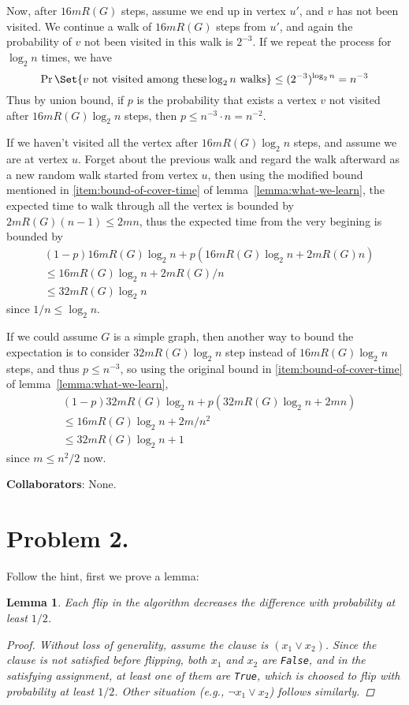 \documentclass[12pt, a4paper]{article}
\newtheorem{lemma}{Lemma}
\begin{document}
Now, after $16 m R(G)$ steps, assume we end up in vertex $u'$, and $v$ has not been visited.
We continue a walk of $16 m R(G)$ steps from $u'$, and again the probability
of $v$ not been visited in this walk is $2^{-3}$. If we repeat the process
for $\log_2 n$ times, we have
\[ \Pr\Set{ v \text{ not visited among these} \log_2 n \text{ walks} } \leq (2^{-3})^{\log_2 n} = n^{-3} \]
Thus by union bound, if $p$ is the probability that exists a vertex $v$ not visited after
$16 m R(G) \log_2 n$ steps, then $p \leq n^{-3} \cdot n = n^{-2}$.

If we haven't visited all the vertex after $16 m R(G) \log_2 n$ steps,
and assume we are at vertex $u$. Forget about the previous walk and regard
the walk afterward as a new random walk started from vertex $u$,
then using the modified bound mentioned in
\ref{item:bound-of-cover-time} of lemma~\ref{lemma:what-we-learn},
the expected time to walk through all the vertex is bounded by $2 m R(G) (n-1) \leq 2mn$,
thus the expected time from the very begining is bounded by
\begin{align*}
  & (1-p) 16 m R(G) \log_2 n + p ( 16 m R(G) \log_2 n + 2m R(G) n) \\
  & \leq 16 m R(G) \log_2 n + 2mR(G)/n \\
  & \leq 32 m R(G) \log_2 n
\end{align*}
since $1/n \leq \log_2 n$.

If we could assume $G$ is a simple graph, then another way to bound the expectation
is to consider $32 m R(G) \log_2 n$ step instead of $16 m R(G) \log_2 n$ steps,
and thus $p \leq n^{-3}$, so
using the original bound in \ref{item:bound-of-cover-time} of lemma~\ref{lemma:what-we-learn},
\begin{align*}
  & (1-p) 32 m R(G) \log_2 n + p ( 32 m R(G) \log_2 n + 2m n) \\
  & \leq 16 m R(G) \log_2 n + 2m/n^2 \\
  & \leq 32 m R(G) \log_2 n + 1
\end{align*}
since $m \leq n^2 / 2$ now.

{\bf Collaborators}: None.

\section{Problem 2.}
Follow the hint, first we prove a lemma: \smallskip
\begin{lemma}
  Each flip in the algorithm decreases the difference with probability at least $1/2$.

  \begin{proof}
    Without loss of generality, assume the clause is $(x_1 \lor x_2)$.
    Since the clause is not satisfied before flipping, both $x_1$ and $x_2$
    are \texttt{False}, and in the satisfying assignment, at least one of
    them are \texttt{True}, which is choosed to flip with probability
    at least $1/2$.
    Other situation (e.g., $\lnot x_1 \lor x_2$) follows similarly.
  \end{proof}
\end{lemma}
\end{document}
